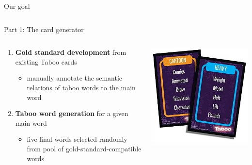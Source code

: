 \documentclass[11pt]{beamer}
\begin{document}
\begin{frame}{Our goal}
\begin{columns}
\begin{column}{0.5\textwidth}
\end{column}
	
\end{columns}

\end{frame}


\begin{frame}{Part 1: The card generator}

\begin{columns}
	
	\begin{column}{0.6\textwidth}

	\begin{enumerate}
		\item \textbf{Gold standard development} from existing Taboo cards
		\begin{itemize}
			\item manually annotate the semantic relations of taboo words to the main word
		\end{itemize}
		\item \textbf{Taboo word generation} for a given main word
		\begin{itemize}
			\item five final words selected randomly from pool of gold-standard-compatible words 
		\end{itemize}
	\end{enumerate}

	\end{column}
	
	\begin{column}{0.4\textwidth}
		
		\begin{center}
			\includegraphics[width=\linewidth]{cards.jpg}
		\end{center}
	

\end{column}
\end{columns}
\end{frame}
\end{document}
